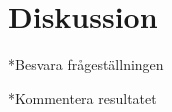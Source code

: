 
\section{Diskussion}
\label{sec:joel_a-discussion}

*Besvara frågeställningen



*Kommentera resultatet
